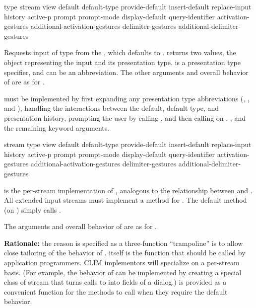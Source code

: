  {type
                 \key stream view
                      default default-type provide-default
                      insert-default replace-input history active-p
                      prompt prompt-mode display-default query-identifier
                      activation-gestures additional-activation-gestures
                      delimiter-gestures additional-delimiter-gestures}

Requests input of type  from the  , which
defaults to .   returns two values, the object
representing the input and its presentation type.   is a presentation
type specifier, and can be an abbreviation.  The other arguments and overall
behavior of  are as for .

 must be implemented by first expanding any presentation type
abbreviations (, , and ), handling the
interactions between the default, default type, and presentation history,
prompting the user by calling , and then calling
 on , , and the remaining keyword
arguments.

 {stream type
                             \key view
                                  default default-type provide-default
                                  insert-default replace-input history active-p
                                  prompt prompt-mode display-default query-identifier
                                  activation-gestures additional-activation-gestures
                                  delimiter-gestures additional-delimiter-gestures}

 is the per-stream implementation of , analogous to
the relationship between  and .  All extended
input streams must implement a method for .  The default
method (on ) simply calls .

The arguments and overall behavior of  are as for .

{\bf Rationale:} the reason  is specified as a three-function
``trampoline'' is to allow close tailoring of the behavior of .
 itself is the function that should be called by application
programmers.  CLIM implementors will specialize  on a
per-stream basis.  (For example, the behavior of  can be
implemented by creating a special class of stream that turns calls to
 into fields of a dialog.)   is provided as a
convenient function for the  methods to call when they require
the default behavior.

